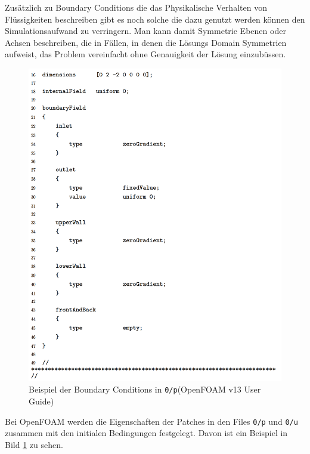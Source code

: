 Zusätzlich zu Boundary Conditions die das Physikalische Verhalten von Flüssigkeiten beschreiben gibt es noch solche die dazu genutzt werden können den Simulationsaufwand zu verringern.
Man kann damit Symmetrie Ebenen oder Achsen beschreiben, die in Fällen, in denen die Lösungs Domain Symmetrien aufweist, das Problem vereinfacht ohne Genauigkeit der Lösung einzubüssen.

\begin{figure}[h]
	\centering
	\includegraphics[scale=0.14]{papers/openfoam/Bilder/beispiel_boundarycond.png }
	\caption{Beispiel der Boundary Conditions in \texttt{0/p}(OpenFOAM v13 User Guide)}
	\label{openfoam:fig:boundarycond}
\end{figure}

Bei OpenFOAM werden die Eigenschaften der Patches in den Files \texttt{0/p} und \texttt{0/u} zusammen mit den initialen Bedingungen festgelegt. Davon ist ein Beispiel in Bild \ref{openfoam:fig:boundarycond} zu sehen.

